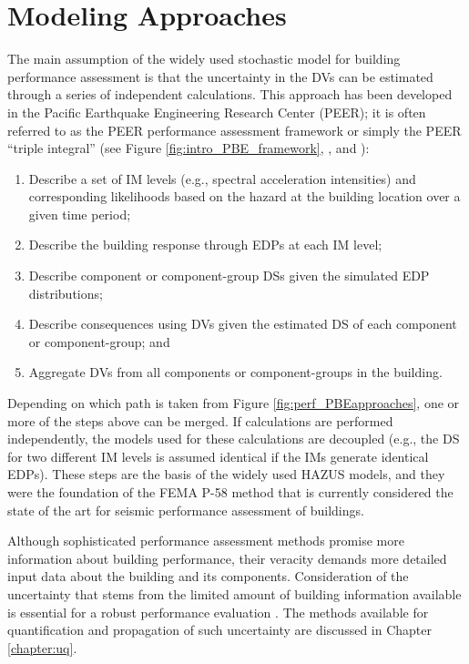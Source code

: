 \section{Modeling Approaches}
\label{sec:perf_bldg_methods}

The main assumption of the widely used stochastic model for building performance assessment is that the uncertainty in the DVs can be estimated through a series of independent calculations. This approach has been developed in the Pacific Earthquake Engineering Research Center (PEER); it is often referred to as the PEER performance assessment framework or simply the PEER ``triple integral'' (see Figure \ref{fig:intro_PBE_framework}, \cite{moehle2004framework}, and \cite{porter2001assemblybased}):

\begin{enumerate}
    \item Describe a set of IM levels (e.g., spectral acceleration intensities) and corresponding likelihoods based on the hazard at the building location over a given time period;

    \item Describe the building response through EDPs at each IM level;

    \item Describe component or component-group DSs given the simulated EDP distributions;

    \item Describe consequences using DVs given the estimated DS of each component or component-group; and

    \item Aggregate DVs from all components or component-groups in the building.
\end{enumerate}

Depending on which path is taken from Figure \ref{fig:perf_PBEapproaches}, one or more of the steps above can be merged. If calculations are performed independently, the models used for these calculations are decoupled (e.g., the DS for two different IM levels is assumed identical if the IMs generate identical EDPs). These steps are the basis of the widely used HAZUS models, and they were the foundation of the FEMA P-58 method that is currently considered the state of the art for seismic performance assessment of buildings.

Although sophisticated performance assessment methods promise more information about building performance, their veracity demands more detailed input data about the building and its components. Consideration of the uncertainty that stems from the limited amount of building information available is essential for a robust performance evaluation \citep{bradley2013critical}. The methods available for quantification and propagation of such uncertainty are discussed in Chapter \ref{chapter:uq}.

